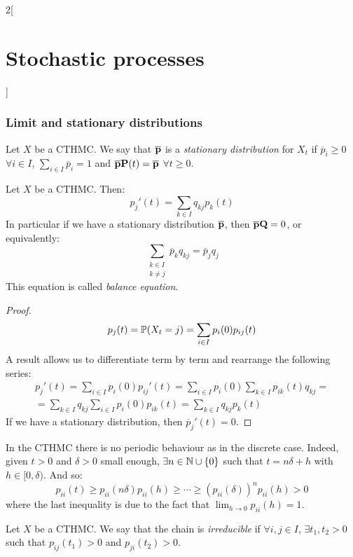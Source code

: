 \documentclass[../../../main_math.tex]{subfiles}
\begin{document}
\begin{multicols}{2}[\section{Stochastic processes}]
  \subsubsection{Limit and stationary distributions}
  \begin{definition}
    Let $X$ be a CTHMC. We say that $\boldsymbol{\mathrm{\overline{p}}}$ is a \emph{stationary distribution} for $X_t$ if $\overline{p}_i\geq 0$ $\forall i\in I$, $\sum_{i\in I}\overline{p}_i =1$ and $\boldsymbol{\mathrm{\overline{p}}}\boldsymbol{\mathrm{P}}(t)=\boldsymbol{\mathrm{\overline{p}}}$ $\forall t\geq 0$.
  \end{definition}
  \begin{lemma}
    Let $X$ be a CTHMC. Then:
    $$
      {p_j}'(t)=\sum_{k\in I} q_{kj}p_k(t)
    $$
    In particular if we have a stationary distribution $\boldsymbol{\mathrm{\overline{p}}}$, then $\boldsymbol{\mathrm{\overline{p}}}\boldsymbol{\mathrm{Q}}=0$, or equivalently:
    $$
      \sum_{\substack{k\in I\\k\ne j}}\overline{p}_kq_{kj}=\overline{p}_jq_j
    $$
    This equation is called \emph{balance equation}.
  \end{lemma}
  \begin{proof}
    $$
      p_j(t) = \mathbb{P}(X_t=j) = \sum_{i\in I} p_i(0)p_{ij}(t)
    $$
    A result allows us to differentiate term by term and rearrange the following series:
    \begin{multline*}
      {p_j}'(t) = \sum_{i\in I} p_i(0){p_{ij}}'(t) = \sum_{i\in I} p_i(0)\sum_{k\in I}p_{ik}(t)q_{kj}  = \\= \sum_{k\in I}q_{kj}\sum_{i\in I}p_i(0)p_{ik}(t)=\sum_{k\in I}q_{kj}p_k(t)
    \end{multline*}
    If we have a stationary distribution, then ${\overline{p}_j}' (t)=0$.
  \end{proof}
  \begin{remark}
    In the CTHMC there is no periodic behaviour as in the discrete case. Indeed, given $t>0$ and $\delta>0$ small enough, $\exists n\in\mathbb{N}\cup\{0\}$ such that $t=n\delta +h$ with $h\in[0,\delta)$. And so:
    $$
      p_{ii}(t)\geq p_{ii}{(n\delta)} p_{ii}(h) \geq \cdots\geq {(p_{ii}(\delta))}^n p_{ii}(h)>0
    $$
    where the last inequality is due to the fact that $\displaystyle\lim_{h\to 0}p_{ii}(h)=1$.
  \end{remark}
  \begin{definition}
    Let $X$ be a CTHMC. We say that the chain is \emph{irreducible} if $\forall i,j\in I$, $\exists t_1,t_2>0$ such that $p_{ij}(t_1)>0$ and $p_{ji}(t_2)>0$.
  \end{definition}
  \begin{theorem}\label{SP:limit_distribution}

\end{theorem}
\end{multicols}
\end{document}
